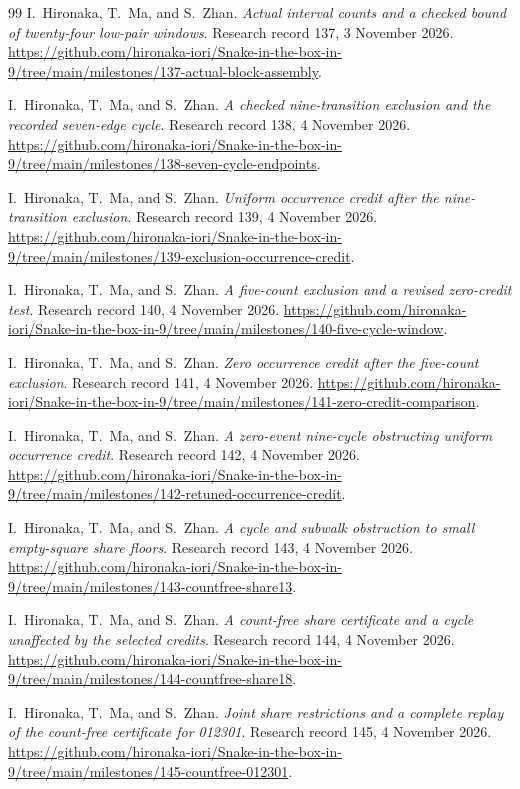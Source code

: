 \documentclass[11pt,a4paper]{article}
\theoremstyle{definition}
\theoremstyle{remark}
\begin{document}
\begin{thebibliography}{99}
I.~Hironaka, T.~Ma, and S.~Zhan. \emph{Actual interval counts and a checked bound of twenty-four low-pair windows}. Research record 137, 3 November 2026.
\url{https://github.com/hironaka-iori/Snake-in-the-box-in-9/tree/main/milestones/137-actual-block-assembly}.

I.~Hironaka, T.~Ma, and S.~Zhan. \emph{A checked nine-transition exclusion and the recorded seven-edge cycle}. Research record 138, 4 November 2026.
\url{https://github.com/hironaka-iori/Snake-in-the-box-in-9/tree/main/milestones/138-seven-cycle-endpoints}.

I.~Hironaka, T.~Ma, and S.~Zhan. \emph{Uniform occurrence credit after the nine-transition exclusion}. Research record 139, 4 November 2026.
\url{https://github.com/hironaka-iori/Snake-in-the-box-in-9/tree/main/milestones/139-exclusion-occurrence-credit}.

I.~Hironaka, T.~Ma, and S.~Zhan. \emph{A five-count exclusion and a revised zero-credit test}. Research record 140, 4 November 2026.
\url{https://github.com/hironaka-iori/Snake-in-the-box-in-9/tree/main/milestones/140-five-cycle-window}.

I.~Hironaka, T.~Ma, and S.~Zhan. \emph{Zero occurrence credit after the five-count exclusion}. Research record 141, 4 November 2026.
\url{https://github.com/hironaka-iori/Snake-in-the-box-in-9/tree/main/milestones/141-zero-credit-comparison}.

I.~Hironaka, T.~Ma, and S.~Zhan. \emph{A zero-event nine-cycle obstructing uniform occurrence credit}. Research record 142, 4 November 2026.
\url{https://github.com/hironaka-iori/Snake-in-the-box-in-9/tree/main/milestones/142-retuned-occurrence-credit}.

I.~Hironaka, T.~Ma, and S.~Zhan. \emph{A cycle and subwalk obstruction to small empty-square share floors}. Research record 143, 4 November 2026.
\url{https://github.com/hironaka-iori/Snake-in-the-box-in-9/tree/main/milestones/143-countfree-share13}.

I.~Hironaka, T.~Ma, and S.~Zhan. \emph{A count-free share certificate and a cycle unaffected by the selected credits}. Research record 144, 4 November 2026.
\url{https://github.com/hironaka-iori/Snake-in-the-box-in-9/tree/main/milestones/144-countfree-share18}.

I.~Hironaka, T.~Ma, and S.~Zhan. \emph{Joint share restrictions and a complete replay of the count-free certificate for 012301}. Research record 145, 4 November 2026.
\url{https://github.com/hironaka-iori/Snake-in-the-box-in-9/tree/main/milestones/145-countfree-012301}.


\end{thebibliography}
\end{document}
